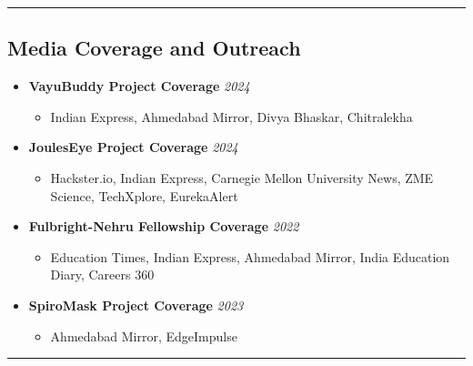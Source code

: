 \documentclass[letter,10pt]{article}
\begin{document}
\ifcvshort\else
\vspace{0.5em}
\noindent\rule{\textwidth}{0.5pt}
\vspace{-0.2em}

\subsection*{\textbf{Media Coverage and Outreach}}
\vspace{-0.4em}
\begin{itemize}
\itemsep0em 
    \item[] \textbf{VayuBuddy Project Coverage} \hfill \textit{2024}
    \begin{itemize}
    \item Indian Express, Ahmedabad Mirror, Divya Bhaskar, Chitralekha
    \end{itemize}
    
    \item[] \textbf{JoulesEye Project Coverage} \hfill \textit{2024}
    \begin{itemize}
    \item Hackster.io, Indian Express, Carnegie Mellon University News, ZME Science, TechXplore, EurekaAlert
    \end{itemize}
    
    \item[] \textbf{Fulbright-Nehru Fellowship Coverage} \hfill \textit{2022}
    \begin{itemize}
    \item Education Times, Indian Express, Ahmedabad Mirror, India Education Diary, Careers 360
    \end{itemize}
    
    \item[] \textbf{SpiroMask Project Coverage} \hfill \textit{2023}
    \begin{itemize}
    \item Ahmedabad Mirror, EdgeImpulse
    \end{itemize}
\end{itemize}

\vspace{0.5em}
\noindent\rule{\textwidth}{0.5pt}
\vspace{-0.2em}
\end{document}
